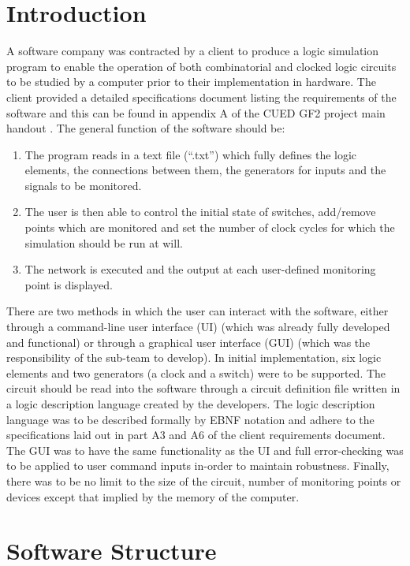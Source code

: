 \documentclass{article}					%
\begin{document}
\section{Introduction}
A software company was contracted by a client to produce a logic simulation program to enable the operation of both combinatorial and clocked logic circuits to be studied by a computer prior to their implementation in hardware. The client provided a detailed specifications document listing the requirements of the software and this can be found in appendix A of the CUED GF2 project main handout \cite{gee_agboola_2018}. The general function of the software should be:
\begin{enumerate}
	\item The program reads in a text file (“.txt”)  which fully defines the logic elements, the connections between them, the generators for inputs and the signals to be monitored.
	\item The user is then able to control the initial state of switches, add/remove points which are monitored and set the number of clock cycles for which the simulation should be run at will.
	\item The network is executed and the output at each user-defined monitoring point is displayed.
\end{enumerate}
There are two methods in which the user can interact with the software, either through a command-line user interface (UI) (which was already fully developed and functional) or through a graphical user interface (GUI) (which was the responsibility of the sub-team to develop). In initial implementation, six logic elements and two generators (a clock and a switch) were to be supported. The circuit should be read into the software through a circuit definition file written in a logic description language created by the developers. The logic description language was to be described formally by EBNF notation and adhere to the specifications laid out in part A3 and A6 of the client requirements document. The GUI was to have the same functionality as the UI and full error-checking was to be applied to user command inputs in-order to maintain robustness. Finally, there was to be no limit to the size of the circuit, number of monitoring points or devices except that implied by the memory of the computer.
\section{Software Structure}
\end{document}
